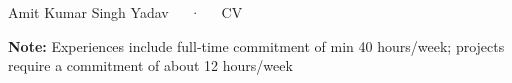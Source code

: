 \documentclass[11pt, a4paper]{awesome-cv}
\begin{document}
\makecvheader[R] 
\\ 
\\
\vspace{-1cm}
\makecvfooter
{}
  {Amit Kumar Singh Yadav~~~·~~~CV}
  {\thepage}


% 

\vspace{-0.3cm}

\vspace{-0.3cm}

\vspace{-0.3cm}

\vspace{-0.3cm}

\vspace{-0.3cm}
% 
% 
% 

\begin{cvparagraph} \textbf{Note:} Experiences include full‑time commitment of min 40 hours/week; projects require a commitment of about 12 hours/week  \end{cvparagraph}
\vspace{-0.3cm}

% 
% 

\vspace{-0.3cm}

\vspace{-0.3cm}

\end{document}

